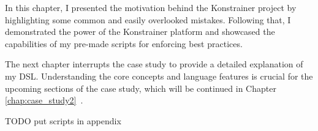 In this chapter, I presented the motivation behind the Konstrainer project by highlighting some common and easily overlooked mistakes. Following that, I demonstrated the power of the Konstrainer platform and showcased the capabilities of my pre-made scripts for enforcing best practices. 

The next chapter interrupts the case study to provide a detailed explanation of my DSL. Understanding the core concepts and language features is crucial for the upcoming sections of the case study, which will be continued in Chapter \ref{chap:case_study2}~.

TODO put scripts in appendix

